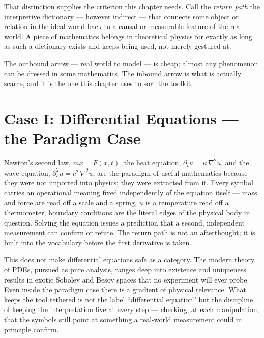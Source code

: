 \documentclass[11pt]{book}
\newcommand{\RW}{\textsc{Real World}}
\newcommand{\IW}{\textsc{Ideal World}}
\begin{document}
That distinction supplies the criterion this chapter needs. Call the \emph{return path} the interpretive dictionary --- however indirect --- that connects some object or relation in the ideal world back to a causal or measurable feature of the real world. A piece of mathematics belongs in theoretical physics for exactly as long as such a dictionary exists and keeps being used, not merely gestured at.

\begin{center}
\end{center}

The outbound arrow --- real world to model --- is cheap; almost any phenomenon can be dressed in some mathematics. The inbound arrow is what is actually scarce, and it is the one this chapter uses to sort the toolkit.

\section{Case I: Differential Equations --- the Paradigm Case}

Newton's second law, $m\ddot{x} = F(x,t)$, the heat equation, $\partial_t u = \kappa\,\nabla^2 u$, and the wave equation, $\partial_t^2 u = c^2\,\nabla^2 u$, are the paradigm of useful mathematics because they were not imported into physics; they were extracted from it. Every symbol carries an operational meaning fixed independently of the equation itself --- mass and force are read off a scale and a spring, $u$ is a temperature read off a thermometer, boundary conditions are the literal edges of the physical body in question. Solving the equation issues a prediction that a second, independent measurement can confirm or refute. The return path is not an afterthought; it is built into the vocabulary before the first derivative is taken.

This does not make differential equations safe as a category. The modern theory of PDEs, pursued as pure analysis, ranges deep into existence and uniqueness results in exotic Sobolev and Besov spaces that no experiment will ever probe. Even inside the paradigm case there is a gradient of physical relevance. What keeps the tool tethered is not the label ``differential equation'' but the discipline of keeping the interpretation live at every step --- checking, at each manipulation, that the symbols still point at something a real-world measurement could in principle confirm.
\end{document}

